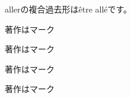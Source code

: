 \documentclass{article}
\begin{document}
\selectfont
allerの複合過去形は\^etre all\'eです。\par
\selectfont
著作は\textcopyright マーク\par
{}\selectfont
著作は\textcopyright マーク\par
\selectfont
著作は\textcopyright マーク\par
{}\selectfont
著作は\textcopyright マーク\par
\end{document}
